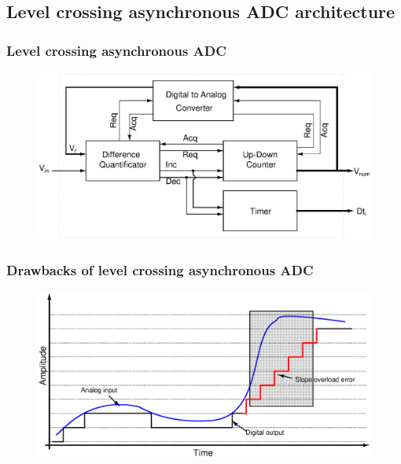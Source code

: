 \documentclass{beamer}
\begin{document}
\subsection*{Level crossing asynchronous ADC architecture}
\begin{frame}
	\frametitle{Level crossing asynchronous ADC} \footnotesize
	\begin{center}
		\begin{figure}
			\includegraphics[width=10 cm,height=5 cm,angle=360]{Figures/05ADCAsync.ps}\\
		\end{figure}
		\scriptsize{ \color{blue}{Block diagram of the level crossing asynchronous ADC}}
	\end{center}
\let\thefootnote\relax{}
\end{frame}
\begin{frame}
	\frametitle{Drawbacks of level crossing asynchronous ADC} \footnotesize
	\begin{center}
		\begin{figure}
			\includegraphics[width=10 cm,height=5 cm,angle=360]{Figures/06LCSPSpeed.ps}\\
		\end{figure}
		\scriptsize{ \color{blue}{Waveform showing slope overload error in level crossing ADC}}
	\end{center}
\end{frame}
\end{document}
